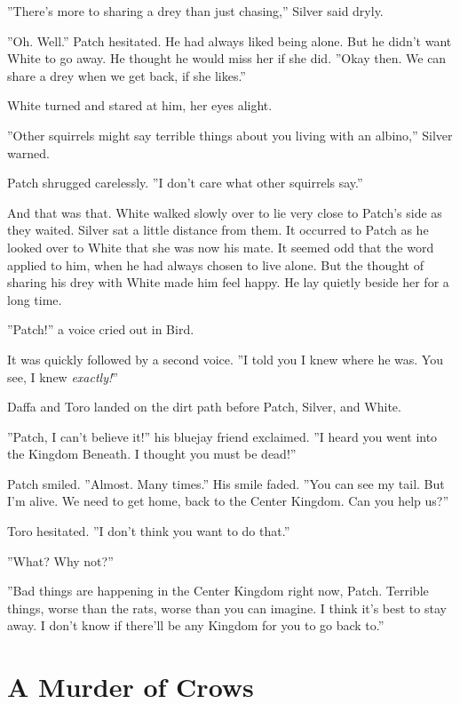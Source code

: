 \documentclass[12pt]{book}
\begin{document}
 ''There's more to sharing a drey than just chasing,'' Silver said dryly.\par
 ''Oh. Well.'' Patch hesitated. He had always liked being alone. But he didn't want White to go away. He thought he would miss her if she did. ''Okay then. We can share a drey when we get back, if she likes.''\par
 White turned and stared at him, her eyes alight.\par
 ''Other squirrels might say terrible things about you living with an albino,'' Silver warned.\par
 Patch shrugged carelessly. ''I don't care what other squirrels say.''\par
 And that was that. White walked slowly over to lie very close to Patch's side as they waited. Silver sat a little distance from them. It occurred to Patch as he looked over to White that she was now his mate. It seemed odd that the word applied to him, when he had always chosen to live alone. But the thought of sharing his drey with White made him feel happy. He lay quietly beside her for a long time.\par
 ''Patch!'' a voice cried out in Bird.\par
 It was quickly followed by a second voice. ''I told you I knew where he was. You see, I knew {\it exactly!}''\par
 Daffa and Toro landed on the dirt path before Patch, Silver, and White.\par
 ''Patch, I can't believe it!'' his bluejay friend exclaimed. ''I heard you went into the Kingdom Beneath. I thought you must be dead!''\par
 Patch smiled. ''Almost. Many times.'' His smile faded. ''You can see my tail. But I'm alive. We need to get home, back to the Center Kingdom. Can you help us?''\par
 Toro hesitated. ''I don't think you want to do that.''\par
 ''What? Why not?''\par
 ''Bad things are happening in the Center Kingdom right now, Patch. Terrible things, worse than the rats, worse than you can imagine. I think it's best to stay away. I don't know if there'll be any Kingdom for you to go back to.''\par

\section{A Murder of Crows}
\end{document}
